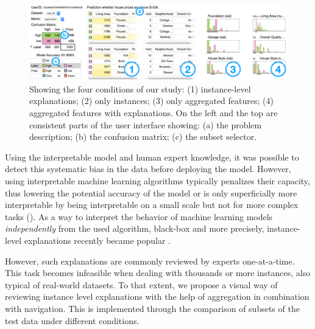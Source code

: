\begin{figure}[t]
 \centering
 \includegraphics[width=\linewidth]{aggexplain/teaser.pdf}
 \caption[Showing the four study conditions.]{
Showing the four conditions of our study: (1) instance-level explanations; (2) only instances; (3) only aggregated features; (4) aggregated features with explanations.
On the left and the top are consistent parts of the user interface showing: (a) the problem description; (b) the confusion matrix; (c) the subset selector.
 }
 \label{figs:teaser}
\end{figure}

Using the interpretable model and human expert knowledge, it was possible to detect this systematic bias in the data before deploying the model.
However, using interpretable machine learning algorithms typically penalizes their capacity, thus lowering the potential accuracy of the model \cite{Caruana:2015:IMH:2783258.2788613} or is only superficially more interpretable by being interpretable on a small scale but not for more complex tasks (\cite{lipton2016mythos,2016arXiv160605685K}).
As a way to interpret the behavior of machine learning models \emph{independently} from the used algorithm, black-box and more precisely, instance-level explanations recently became popular \cite{Martens:2014:EDD:2600518.2600523,DBLP:journals/corr/RibeiroSG16,prospector}.

However, such explanations are commonly reviewed by experts one-at-a-time.
This task becomes infeasible when dealing with thousands or more instances, also typical of real-world datasets.
To that extent, we propose a visual way of reviewing instance level explanations with the help of aggregation in combination with navigation.
This is implemented through the comparison of subsets of the test data under different conditions.

